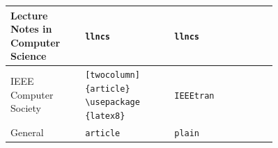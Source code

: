 \documentclass[twocolumn]{article}
\begin{document}
\begin{xtabular}{
		p{0.20\linewidth}
		p{0.26\linewidth}
		p{0.19\linewidth}
		m{0.11\linewidth}
	}
	\midrule
	Lecture Notes in Computer Science& \Verb|llncs|& \Verb|llncs|&  \\ 
	\midrule
	IEEE Computer Society                             & {\Verb|[twocolumn]| \verb|{article}|  \Verb|\usepackage|  \Verb|{latex8}|} & \Verb|IEEEtran|                &  \\ 
	\midrule
	General & \Verb|article|  & \Verb|plain|  &  \\ 
	\bottomrule
\end{xtabular}
\end{document}
